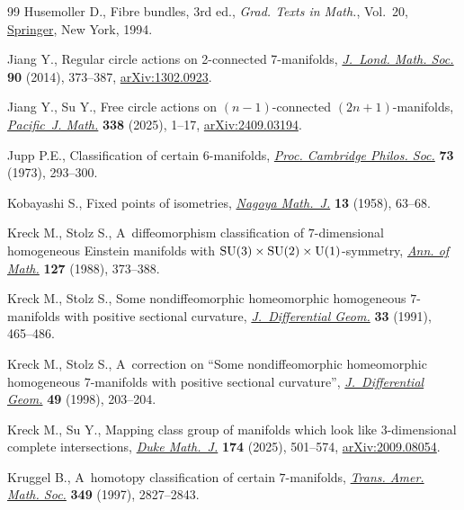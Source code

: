 \documentclass[10pt,a4paper]{amsart}
\numberwithin{equation}{section}
\theoremstyle{definition}
\numberwithin{table}{section}
\begin{document}
\begin{thebibliography}{99}
Husemoller D., Fibre bundles, 3rd ed., \textit{Grad. Texts in Math.}, Vol.~20,
  \href{https://doi.org/10.1007/978-1-4757-2261-1}{Springer}, New York, 1994.

Jiang Y., Regular circle actions on 2-connected 7-manifolds,
  \href{https://doi.org/10.1112/jlms/jdu028}{\textit{J.~Lond. Math. Soc.}}
  \textbf{90} (2014), 373--387,
  \href{https://arxiv.org/abs/1302.0923}{arXiv:1302.0923}.

Jiang Y., Su Y., Free circle actions on {$(n-1)$}-connected
  {$(2n+1)$}-manifolds,
  \href{https://doi.org/10.2140/pjm.2025.338.1}{\textit{Pacific~J. Math.}}
  \textbf{338} (2025), 1--17,
  \href{https://arxiv.org/abs/2409.03194}{arXiv:2409.03194}.

Jupp P.E., Classification of certain {$6$}-manifolds,
  \href{https://doi.org/10.1017/s0305004100076854}{\textit{Proc. Cambridge
  Philos. Soc.}} \textbf{73} (1973), 293--300.

Kobayashi S., Fixed points of isometries,
  \href{https://doi.org/10.1017/S0027763000023497}{\textit{Nagoya Math.~J.}}
  \textbf{13} (1958), 63--68.

Kreck M., Stolz S., A~diffeomorphism classification of {$7$}-dimensional
  homogeneous {E}instein manifolds with {${\rm SU}(3)\times{\rm
  SU}(2)\times{\rm U}(1)$}-symmetry,
  \href{https://doi.org/10.2307/2007059}{\textit{Ann. of Math.}} \textbf{127}
  (1988), 373--388.

Kreck M., Stolz S., Some nondiffeomorphic homeomorphic homogeneous
  {$7$}-manifolds with positive sectional curvature,
  \href{https://doi.org/10.4310/jdg/1214446327}{\textit{J.~Differential Geom.}}
  \textbf{33} (1991), 465--486.

Kreck M., Stolz S., A~correction on ``{S}ome nondiffeomorphic homeomorphic
  homogeneous {$7$}-manifolds with positive sectional curvature'',
  \href{https://doi.org/10.4310/jdg/1214460941}{\textit{J.~Differential Geom.}}
  \textbf{49} (1998), 203--204.

Kreck M., Su Y., Mapping class group of manifolds which look like 3-dimensional
  complete intersections,
  \href{https://doi.org/10.1215/00127094-2024-0036}{\textit{Duke Math.~J.}}
  \textbf{174} (2025), 501--574,
  \href{https://arxiv.org/abs/2009.08054}{arXiv:2009.08054}.

Kruggel B., A~homotopy classification of certain {$7$}-manifolds,
  \href{https://doi.org/10.1090/S0002-9947-97-01962-4}{\textit{Trans. Amer.
  Math. Soc.}} \textbf{349} (1997), 2827--2843.


\end{thebibliography}
\end{document}
